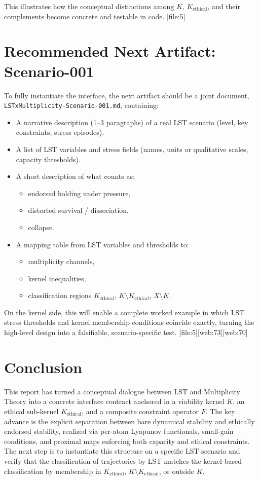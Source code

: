 \documentclass[11pt]{article}
\begin{document}
This illustrates how the conceptual distinctions among \(K\), \(K_{\text{ethical}}\), and their complements become concrete and testable in code. [file:5]

\section{Recommended Next Artifact: Scenario-001}

To fully instantiate the interface, the next artifact should be a joint document, \texttt{LSTxMultiplicity-Scenario-001.md}, containing:

\begin{itemize}[leftmargin=*]
  \item A narrative description (1--3 paragraphs) of a real LST scenario (level, key constraints, stress episodes).
  \item A list of LST variables and stress fields (names, units or qualitative scales, capacity thresholds).
  \item A short description of what counts as:
  \begin{itemize}
    \item endorsed holding under pressure,
    \item distorted survival / dissociation,
    \item collapse.
  \end{itemize}
  \item A mapping table from LST variables and thresholds to:
  \begin{itemize}
    \item multiplicity channels,
    \item kernel inequalities,
    \item classification regions \(K_{\text{ethical}}\), \(K\setminus K_{\text{ethical}}\), \(X\setminus K\).
  \end{itemize}
\end{itemize}

On the kernel side, this will enable a complete worked example in which LST stress thresholds and kernel membership conditions coincide exactly, turning the high-level design into a falsifiable, scenario-specific test. [file:5][web:73][web:70]

\section{Conclusion}

This report has turned a conceptual dialogue between LST and Multiplicity Theory into a concrete interface contract anchored in a viability kernel \(K\), an ethical sub-kernel \(K_{\text{ethical}}\), and a composite constraint operator \(F\). The key advance is the explicit separation between bare dynamical stability and ethically endorsed stability, realized via per-atom Lyapunov functionals, small-gain conditions, and proximal maps enforcing both capacity and ethical constraints. The next step is to instantiate this structure on a specific LST scenario and verify that the classification of trajectories by LST matches the kernel-based classification by membership in \(K_{\text{ethical}}\), \(K\setminus K_{\text{ethical}}\), or outside \(K\).
\end{document}
